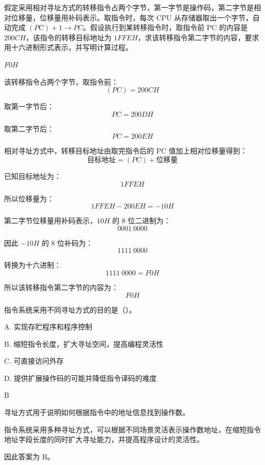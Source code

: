\begin{question}
假定采用相对寻址方式的转移指令占两个字节，第一字节是操作码，第二字节是相对位移量，位移量用补码表示。取指令时，每次 CPU 从存储器取出一个字节，自动完成 $(PC)+1 \rightarrow PC$。假设执行到某转移指令时，取指令前 PC 的内容是 $200CH$，该指令的转移目标地址为 $1FFEH$，求该转移指令第二字节的内容，要求用十六进制形式表示，并写明计算过程。
\end{question}

\begin{answer}
$F0H$
\end{answer}

\begin{analysisenv}
该转移指令占两个字节，取指令前：
\[
(PC)=200CH
\]

取第一字节后：
\[
PC=200DH
\]

取第二字节后：
\[
PC=200EH
\]

相对寻址方式中，转移目标地址由取完指令后的 PC 值加上相对位移量得到：
\[
\text{目标地址}=(PC)+\text{位移量}
\]

已知目标地址为：
\[
1FFEH
\]

所以位移量为：
\[
1FFEH-200EH=-10H
\]

第二字节位移量用补码表示，$10H$ 的 8 位二进制为：
\[
0001\ 0000
\]

因此 $-10H$ 的 8 位补码为：
\[
1111\ 0000
\]

转换为十六进制：
\[
1111\ 0000=F0H
\]

所以该转移指令第二字节的内容为：
\[
F0H
\]
\end{analysisenv}



\begin{question}
指令系统采用不同寻址方式的目的是（）。

A. 实现存贮程序和程序控制

B. 缩短指令长度，扩大寻址空间，提高编程灵活性

C. 可直接访问外存

D. 提供扩展操作码的可能并降低指令译码的难度
\end{question}

\begin{answer}
B
\end{answer}

\begin{analysisenv}
寻址方式用于说明如何根据指令中的地址信息找到操作数。

指令系统采用多种寻址方式，可以根据不同场景灵活表示操作数地址，在缩短指令地址字段长度的同时扩大寻址能力，并提高程序设计的灵活性。

因此答案为 B。
\end{analysisenv}




